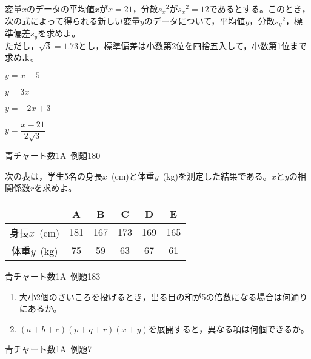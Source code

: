 \documentclass[b4paper, dvipdfmx, 11pt, fleqn, twocolumn, uplatex]{jsarticle}
\newenvironment{tabbedenum}[1]
{\NumTabs{#1}\begin{enumerate*}[label={(\arabic*)},itemjoin={\tab}]}{\end{enumerate*}}
\begin{document}

\begin{screen}
変量$x$のデータの平均値$\overline{x}$が$\overline{x}=21$，分散${s_x}^2$が${s_x}^2=12$であるとする。このとき，次の式によって得られる新しい変量$y$のデータについて，平均値$\overline{y}$，分散${s_y}^2$，標準偏差$s_y$を求めよ。\\
ただし，$\sqrt3=1.73$とし，標準偏差は小数第2位を四捨五入して，小数第1位まで求めよ。\\
\begin{tabbedenum}{2}
\item $y=x-5$
\item $y=3x$
\item $y=-2x+3$
\item $y=\dfrac{x-21}{2\sqrt3}$
\end{tabbedenum}
\begin{flushright}
    青チャート数1A~例題180
\end{flushright}
\end{screen}


\begin{screen}
次の表は，学生5名の身長$x$~(\si{cm})と体重$y$~(\si{kg})を測定した結果である。$x$と$y$の相関係数$r$を求めよ。
\begin{center}
  \begin{tabular}{c||c|c|c|c|c} \hline
    &  A& B & C & D & E \\ \hline
    身長$x$~(\si{cm}) &181 & 167 & 173 & 169 & 165 \\
    体重$y$~(\si{kg}) & 75 & 59 & 63 & 67 & 61\\
    \hline
  \end{tabular}
\end{center}
\begin{flushright}
    青チャート数1A~例題183
\end{flushright}
\end{screen}



\begin{screen}
\begin{enumerate}[label={(\arabic*)}]
\item 大小2個のさいころを投げるとき，出る目の和が5の倍数になる場合は何通りにあるか。
\item $(a+b+c)(p+q+r)(x+y)$を展開すると，異なる項は何個できるか。
\end{enumerate}
\begin{flushright}
    青チャート数1A~例題7
\end{flushright}
\end{screen}
\end{document}
